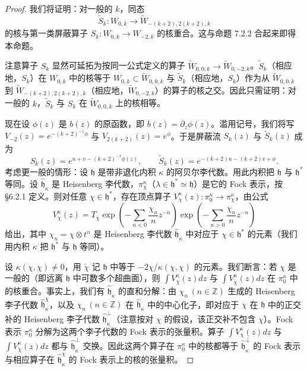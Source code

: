 \begin{proof}
我们将证明：对一般的 $k$，同态
\[
    \widetilde{S}_k:W_{0,k}\longrightarrow\widetilde{W}_{-(k+2),2(k+2),k}
\]
的核与第一类屏蔽算子 $S_k:W_{0,k}\to W_{-2,k}$ 的核重合。这与命题 7.2.2 合起来即得本命题。

注意算子 $S_k$ 显然可延拓为按同一公式定义的算子 $\widetilde{W}_{0,0,k}\to\widetilde{W}_{0,-2,k}$。$\widetilde{S}_k$（相应地，$S_k$）在 $W_{0,k}$ 中的核等于 $W_{0,k}\subset\widetilde{W}_{0,0,k}$ 与 $\widetilde{S}_k$（相应地，$S_k$）作为从 $\widetilde{W}_{0,0,k}$ 到 $\widetilde{W}_{-(k+2),2(k+2),k}$（相应地，$\widetilde{W}_{0,-2,k}$）的算子的核之交。因此只需证明：对一般的 $k$，$\widetilde{S}_k$ 与 $S_k$ 在 $\widetilde{W}_{0,0,k}$ 上的核相等。

现在设 $\phi(z)$ 是 $b(z)$ 的原函数，即 $b(z)=\partial_z\phi(z)$。滥用记号，我们将写 $V_{-2}(z)=e^{-(k+2)^{-1}\phi}$ 与 $V_{2(k+2)}(z)=e^{\phi}$。于是屏蔽流 $S_k(z)$ 与 $\widetilde{S}_k(z)$ 成为
\[
    S_k(z)=e^{u+v-(k+2)^{-1}\phi(z)},\qquad
    \widetilde{S}_k(z)=e^{-(k+2)u-(k+2)v+\phi}.
\]
考虑更一般的情形：设 $\mathfrak{h}$ 是带非退化内积 $\kappa$ 的阿贝尔李代数。用此内积把 $\mathfrak{h}$ 与 $\mathfrak{h}^*$ 等同。设 $\widehat{\mathfrak{h}}_\kappa$ 是 Heisenberg 李代数，$\pi_\chi^\kappa$（$\lambda\in\mathfrak{h}^*\simeq\mathfrak{h}$）是它的 Fock 表示，按 §6.2.1 定义。则对任意 $\chi\in\mathfrak{h}^*$，存在顶点算子 $V_\chi^\kappa(z):\pi_0^\kappa\to\pi_\chi^\kappa$，由公式
\begin{equation}
    V_\chi^\kappa(z)=T_\chi
    \exp\left(-\sum_{n<0}\frac{\chi_n}{n}z^{-n}\right)
    \exp\left(-\sum_{n>0}\frac{\chi_n}{n}z^{-n}\right)
    \tag{7.2-13}
\end{equation}
给出，其中 $\chi_n=\chi\otimes t^n$ 是 Heisenberg 李代数 $\widehat{\mathfrak{h}}_\kappa$ 中对应于 $\chi\in\mathfrak{h}^*$ 的元素（我们用内积 $\kappa$ 把 $\mathfrak{h}^*$ 与 $\mathfrak{h}$ 等同）。

设 $\kappa(\chi,\chi)\ne0$，用 $\check{\chi}$ 记 $\mathfrak{h}$ 中等于 $-2\chi/\kappa(\chi,\chi)$ 的元素。我们断言：若 $\chi$ 是一般的（即远离 $\mathfrak{h}$ 中可数多个超曲面），则 $\int V_\chi^\kappa(z)dz$ 与 $\int V_{\check{\chi}}^\kappa(z)dz$ 在 $\pi_0^\kappa$ 中的核重合。事实上，我们有 $\widehat{\mathfrak{h}}_\kappa$ 的直和分解：由 $\chi_n\,(n\in\mathbb{Z})$ 生成的 Heisenberg 李子代数 $\widehat{\mathfrak{h}}_\kappa^\chi$，以及 $\chi_n\,(n\in\mathbb{Z})$ 在 $\widehat{\mathfrak{h}}_\kappa$ 中的中心化子，即对应于 $\chi$ 在 $\mathfrak{h}$ 中的正交补的 Heisenberg 李子代数 $\widehat{\mathfrak{h}}_\kappa^{\perp}$（注意按对 $\chi$ 的假设，该正交补不包含 $\chi$）。Fock 表示 $\pi_0^\kappa$ 分解为这两个李子代数的 Fock 表示的张量积。算子 $\int V_\chi^\kappa(z)dz$ 与 $\int V_{\check{\chi}}^\kappa(z)dz$ 都与 $\widehat{\mathfrak{h}}_\kappa^{\perp}$ 交换。因此这两个算子在 $\pi_0^\kappa$ 中的核都等于 $\widehat{\mathfrak{h}}_\kappa^{\perp}$ 的 Fock 表示与相应算子在 $\widehat{\mathfrak{h}}_\kappa^\chi$ 的 Fock 表示上的核的张量积。


\end{proof}
